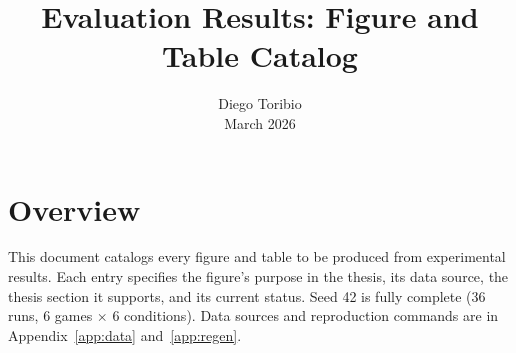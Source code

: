 \documentclass[11pt]{article}
\title{Evaluation Results: Figure and Table Catalog}
\author{Diego Toribio\\[0.3em]{\normalsize March 2026}}
\date{\vspace{-2.5em}}
\begin{document}
\maketitle
\thispagestyle{empty}

\section{Overview}

This document catalogs every figure and table to be produced from
experimental results. Each entry specifies the figure's purpose
in the thesis, its data source, the thesis section it supports,
and its current status. Seed 42 is fully complete (36 runs, 6
games $\times$ 6 conditions). Data sources and reproduction
commands are in Appendix~\ref{app:data} and~\ref{app:regen}.
\end{document}
